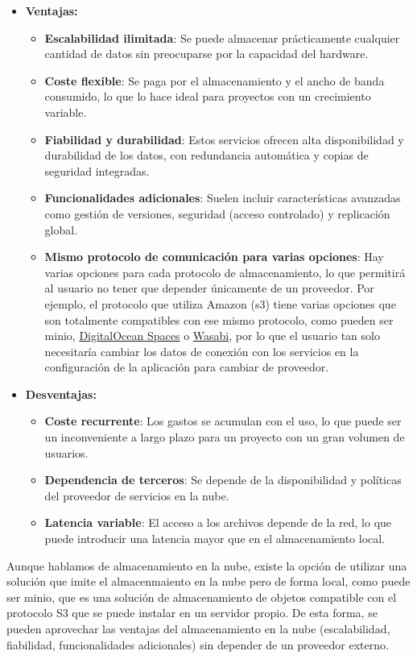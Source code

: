 \begin{itemize}
\item \textbf{Ventajas:}
    \begin{itemize}
        \item \textbf{Escalabilidad ilimitada}: Se puede almacenar prácticamente cualquier cantidad de datos sin preocuparse por la capacidad del hardware.
        \item \textbf{Coste flexible}: Se paga por el almacenamiento y el ancho de banda consumido, lo que lo hace ideal para proyectos con un crecimiento variable.
        \item \textbf{Fiabilidad y durabilidad}: Estos servicios ofrecen alta disponibilidad y durabilidad de los datos, con redundancia automática y copias de seguridad integradas.
        \item \textbf{Funcionalidades adicionales}: Suelen incluir características avanzadas como gestión de versiones, seguridad (acceso controlado) y replicación global.
        \item \textbf{Mismo protocolo de comunicación para varias opciones}: Hay varias opciones para cada protocolo de almacenamiento, lo que permitirá al usuario no tener que depender únicamente de un proveedor. Por ejemplo, el protocolo que utiliza Amazon (\gls{s3}) tiene varias opciones que son totalmente compatibles con ese mismo protocolo, como pueden ser \gls{minio}, \href{https://www.digitalocean.com/products/spaces}{DigitalOcean Spaces} o \href{https://wasabi.com/es}{Wasabi}, por lo que el usuario tan solo necesitaría cambiar los datos de conexión con los servicios en la configuración de la aplicación para cambiar de proveedor.
    \end{itemize}
\item \textbf{Desventajas:}
\begin{itemize}
\item \textbf{Coste recurrente}: Los gastos se acumulan con el uso, lo que puede ser un inconveniente a largo plazo para un proyecto con un gran volumen de usuarios.
\item \textbf{Dependencia de terceros}: Se depende de la disponibilidad y políticas del proveedor de servicios en la nube.
\item \textbf{Latencia variable}: El acceso a los archivos depende de la red, lo que puede introducir una latencia mayor que en el almacenamiento local.
\end{itemize}
\end{itemize}

Aunque hablamos de almacenamiento en la nube, existe la opción de utilizar una solución que imite el almacenmaiento en la nube pero de forma local, como puede ser \gls{minio}, que es una solución de almacenamiento de objetos compatible con el protocolo S3 que se puede instalar en un servidor propio. De esta forma, se pueden aprovechar las ventajas del almacenamiento en la nube (escalabilidad, fiabilidad, funcionalidades adicionales) sin depender de un proveedor externo.

